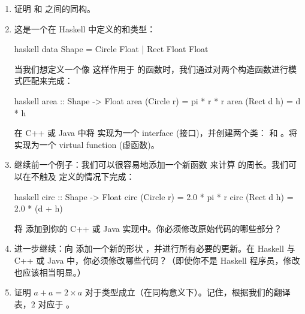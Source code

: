 \begin{enumerate}
  \tightlist
  \item
        证明  和  之间的同构。
  \item
        这是一个在 Haskell 中定义的和类型：

        \begin{snip}{haskell}
data Shape = Circle Float
           | Rect Float Float
\end{snip}
        当我们想定义一个像  这样作用于  的函数时，我们通过对两个构造函数进行模式匹配来完成：

        \begin{snip}{haskell}
area :: Shape -> Float
area (Circle r) = pi * r * r
area (Rect d h) = d * h
\end{snip}
        在 C++ 或 Java 中将  实现为一个 interface (接口)，并创建两个类： 和 。将  实现为一个 virtual function (虚函数)。
  \item
        继续前一个例子：我们可以很容易地添加一个新函数  来计算  的周长。我们可以在不触及  定义的情况下完成：

        \begin{snip}{haskell}
circ :: Shape -> Float
circ (Circle r) = 2.0 * pi * r
circ (Rect d h) = 2.0 * (d + h)
\end{snip}
        将  添加到你的 C++ 或 Java 实现中。你必须修改原始代码的哪些部分？
  \item
        进一步继续：向  添加一个新的形状 ，并进行所有必要的更新。在 Haskell 与 C++ 或 Java 中，你必须修改哪些代码？（即使你不是 Haskell 程序员，修改也应该相当明显。）
  \item
        证明 $a + a = 2 \times a$ 对于类型成立（在同构意义下）。记住，根据我们的翻译表，$2$ 对应于 。
\end{enumerate}
